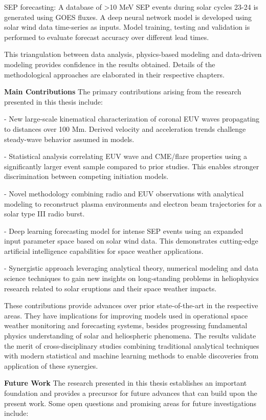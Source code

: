 SEP forecasting: A database of >10 MeV SEP events during solar cycles 23-24 is generated using GOES fluxes. A deep neural network model is developed using solar wind data time-series as inputs. Model training, testing and validation is performed to evaluate forecast accuracy over different lead times.

This triangulation between data analysis, physics-based modeling and data-driven modeling provides confidence in the results obtained. Details of the methodological approaches are elaborated in their respective chapters.

\textbf{Main Contributions}
The primary contributions arising from the research presented in this thesis include:

- New large-scale kinematical characterization of coronal EUV waves propagating to distances over 100 Mm. Derived velocity and acceleration trends challenge steady-wave behavior assumed in models. 

- Statistical analysis correlating EUV wave and CME/flare properties using a significantly larger event sample compared to prior studies. This enables stronger discrimination between competing initiation models.

- Novel methodology combining radio and EUV observations with analytical modeling to reconstruct plasma environments and electron beam trajectories for a solar type III radio burst.

- Deep learning forecasting model for intense SEP events using an expanded input parameter space based on solar wind data. This demonstrates cutting-edge artificial intelligence capabilities for space weather applications.

- Synergistic approach leveraging analytical theory, numerical modeling and data science techniques to gain new insights on long-standing problems in heliophysics research related to solar eruptions and their space weather impacts. 

These contributions provide advances over prior state-of-the-art in the respective areas. They have implications for improving models used in operational space weather monitoring and forecasting systems, besides progressing fundamental physics understanding of solar and heliospheric phenomena. The results validate the merit of cross-disciplinary studies combining traditional analytical techniques with modern statistical and machine learning methods to enable discoveries from application of these synergies.

\textbf{Future Work}
The research presented in this thesis establishes an important foundation and provides a precursor for future advances that can build upon the present work. Some open questions and promising areas for future investigations include:

